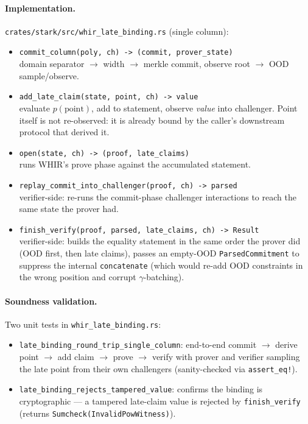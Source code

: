 \paragraph{Implementation.}
\texttt{crates/stark/src/whir\_late\_binding.rs} (single column):
\begin{itemize}
  \item \texttt{commit\_column(poly, ch) -> (commit, prover\_state)}\\
        domain separator $\to$ width $\to$ merkle commit, observe root
        $\to$ OOD sample/observe.
  \item \texttt{add\_late\_claim(state, point, ch) -> value}\\
        evaluate $p(\mathrm{point})$, add to statement, observe
        \emph{value} into challenger.  Point itself is not re-observed:
        it is already bound by the caller's downstream protocol that
        derived it.
  \item \texttt{open(state, ch) -> (proof, late\_claims)}\\
        runs WHIR's prove phase against the accumulated statement.
  \item \texttt{replay\_commit\_into\_challenger(proof, ch) -> parsed}\\
        verifier-side: re-runs the commit-phase challenger
        interactions to reach the same state the prover had.
  \item \texttt{finish\_verify(proof, parsed, late\_claims, ch) -> Result}\\
        verifier-side: builds the equality statement in the same order
        the prover did (OOD first, then late claims), passes an
        empty-OOD \texttt{ParsedCommitment} to suppress the internal
        \texttt{concatenate} (which would re-add OOD constraints in
        the wrong position and corrupt $\gamma$-batching).
\end{itemize}

\paragraph{Soundness validation.}
Two unit tests in \texttt{whir\_late\_binding.rs}:
\begin{itemize}
  \item \texttt{late\_binding\_round\_trip\_single\_column}: end-to-end
        commit $\to$ derive point $\to$ add claim $\to$ prove $\to$
        verify with prover and verifier sampling the late point from
        their own challengers (sanity-checked via \texttt{assert\_eq!}).
  \item \texttt{late\_binding\_rejects\_tampered\_value}: confirms the
        binding is cryptographic --- a tampered late-claim value is
        rejected by \texttt{finish\_verify} (returns
        \texttt{Sumcheck(InvalidPowWitness)}).
\end{itemize}

